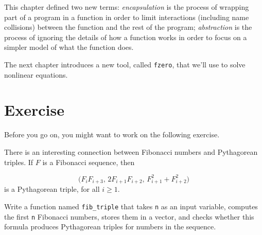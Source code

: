 This chapter defined two new terms: \emph{encapsulation} is the process of wrapping part of a program in
a function in order to limit interactions (including name collisions)
between the function and the rest of the program; \emph{abstraction} is the process of ignoring the details of how a function works in order to focus on a simpler model of what the
function does.

The next chapter introduces a new tool, called \lstinline{fzero}, that we'll use to solve nonlinear equations.


\section{Exercise}

Before you go on, you might want to work on the following exercise.

\begin{ex}

There is an interesting connection between Fibonacci numbers and
Pythagorean triples.  If $F$ is a Fibonacci sequence, then

\begin{equation*}
\big(F_i F_{i+3}, \, 2 F_{i+1} F_{i+2}, \, F_{i+1}^2 + F_{i+2}^2 \big)
\end{equation*}
is a Pythagorean triple, for all $i \ge 1$.

Write a function named \lstinline{fib_triple} that
takes \lstinline{n} as an input variable, computes
the first \lstinline{n} Fibonacci numbers, stores them in a vector,
and checks whether this formula produces Pythagorean triples for numbers in the \mbox{sequence}.


\end{ex}
